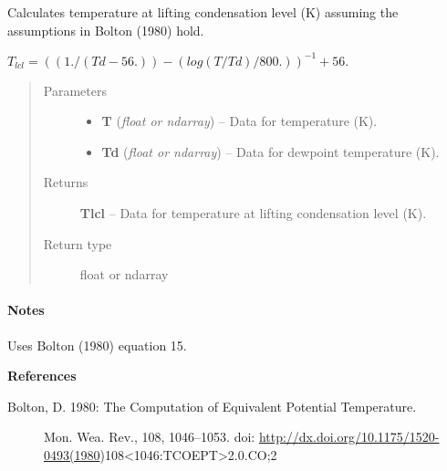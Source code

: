 \documentclass[letterpaper,10pt,english]{sphinxmanual}
\begin{document}
\begin{fulllineitems}
\label{atmos:atmos.equations.Tlcl_from_T_Td}
Calculates temperature at lifting condensation level (K) assuming the
assumptions in Bolton (1980) hold.

\(T_{lcl} = ((1./(Td-56.))-(log(T/Td)/800.))^{-1} + 56.\)
\begin{quote}\begin{description}
\item[{Parameters}] \leavevmode\begin{itemize}
\item {} 
\textbf{T} (\emph{float or ndarray}) -- Data for temperature (K).

\item {} 
\textbf{Td} (\emph{float or ndarray}) -- Data for dewpoint temperature (K).

\end{itemize}

\item[{Returns}] \leavevmode
\textbf{Tlcl} --
Data for temperature at lifting condensation level (K).

\item[{Return type}] \leavevmode
float or ndarray

\end{description}\end{quote}
\paragraph{Notes}

Uses Bolton (1980) equation 15.

\textbf{References}
\begin{description}
\item[{Bolton, D. 1980: The Computation of Equivalent Potential Temperature.}] \leavevmode
Mon. Wea. Rev., 108, 1046–1053.
doi: \href{http://dx.doi.org/10.1175/1520-0493(1980}{http://dx.doi.org/10.1175/1520-0493(1980})108\textless{}1046:TCOEPT\textgreater{}2.0.CO;2

\end{description}

\end{fulllineitems}

\end{document}

